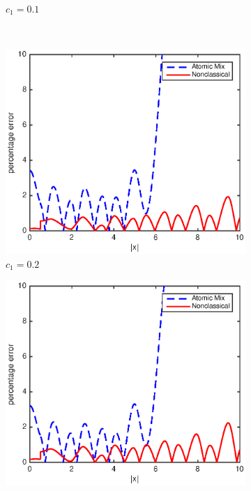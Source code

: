 \documentclass[12pt]{article}
\begin{document}
{\begin{figure}[p]
\begin{subfigure}{0.495\textwidth}
        \caption{$c_1 = 0.1$}
        \label{figerrC10}
    \end{subfigure}
    \\
    \centering
    \begin{subfigure}{0.495\textwidth}
        \centering
        \includegraphics[width=\textwidth]{NSE_err_C20.eps}
        \caption{$c_1 = 0.2$}
        \label{figerrC20}
    \end{subfigure}
    \hfill
    \begin{subfigure}{0.495\textwidth}
        \centering
        \includegraphics[width=\textwidth]{NSE_err_C30.eps}

\end{subfigure}
\end{figure}}
\end{document}
